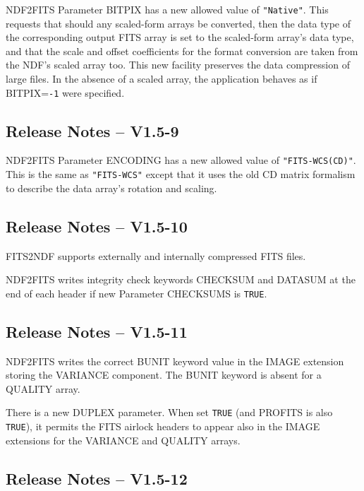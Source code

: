 \documentclass[twoside,11pt]{article}
\newcommand{\htmlref}[2]{#1}
\begin{document}
\htmlref{NDF2FITS}{NDF2FITS} Parameter BITPIX has a new allowed value
of \texttt{"Native"}.  This requests that should any scaled-form arrays be 
converted, then the data type of the corresponding output FITS array 
is set to the scaled-form array's data type, and that the scale and
offset coefficients for the format conversion are taken from the NDF's
scaled array too.  This new facility preserves the data compression
of large files.  In the absence of a scaled array, the application
behaves as if BITPIX=\texttt{-1} were specified.

\subsection{Release Notes -- V1.5-9}

\htmlref{NDF2FITS}{NDF2FITS} Parameter ENCODING has a new allowed
value of \texttt{"FITS-WCS(CD)"}.  This is the same as
\texttt{"FITS-WCS"} except that it uses the old CD matrix formalism 
to describe the data array's rotation and scaling.

\subsection{Release Notes -- V1.5-10}

\htmlref{FITS2NDF}{FITS2NDF} supports externally and internally compressed
FITS files.

\htmlref{NDF2FITS}{NDF2FITS} writes integrity check keywords CHECKSUM
and DATASUM at the end of each header if new Parameter CHECKSUMS is 
\texttt{TRUE}.

\subsection{Release Notes -- V1.5-11}

\htmlref{NDF2FITS}{NDF2FITS} writes the correct BUNIT keyword value in 
the IMAGE extension storing the VARIANCE component.  The BUNIT
keyword is absent for a QUALITY array.

There is a new DUPLEX parameter.  When set \texttt{TRUE} (and PROFITS
is also \texttt{TRUE}), it permits the FITS airlock headers to appear
also in the IMAGE extensions for the VARIANCE and QUALITY arrays.

\subsection{Release Notes -- V1.5-12}
\end{document}

